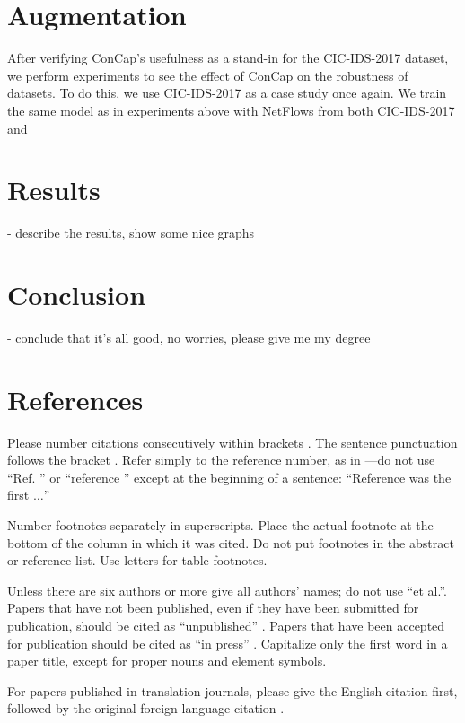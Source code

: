\documentclass[conference]{IEEEtran}
\begin{document}
	\section{Augmentation}\label{augmentation}
	After verifying ConCap's usefulness as a stand-in for the CIC-IDS-2017 dataset, we perform experiments to see the effect of ConCap on the robustness of datasets. To do this, we use CIC-IDS-2017 as a case study once again. We train the same model as in experiments above with NetFlows from both CIC-IDS-2017 and 
	
	\section{Results}
	
	- describe the results, show some nice graphs
	
	\section{Conclusion}
	
	- conclude that it's all good, no worries, please give me my degree
	
	\section*{References}
	
	Please number citations consecutively within brackets \cite{b1}. The 
	sentence punctuation follows the bracket \cite{b2}. Refer simply to the reference 
	number, as in \cite{b3}---do not use ``Ref. \cite{b3}'' or ``reference \cite{b3}'' except at 
	the beginning of a sentence: ``Reference \cite{b3} was the first $\ldots$''
	
	Number footnotes separately in superscripts. Place the actual footnote at 
	the bottom of the column in which it was cited. Do not put footnotes in the 
	abstract or reference list. Use letters for table footnotes.
	
	Unless there are six authors or more give all authors' names; do not use 
	``et al.''. Papers that have not been published, even if they have been 
	submitted for publication, should be cited as ``unpublished'' \cite{b4}. Papers 
	that have been accepted for publication should be cited as ``in press'' \cite{b5}. 
	Capitalize only the first word in a paper title, except for proper nouns and 
	element symbols.
	
	For papers published in translation journals, please give the English 
	citation first, followed by the original foreign-language citation \cite{b6}.
	
\end{document}
